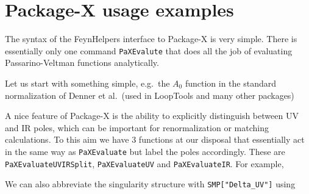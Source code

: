 \documentclass[../FeynHelpersManual.tex]{subfiles}
\begin{document}
\hypertarget{package-x usage examples}{
\section{Package-X usage examples}\label{package-x usage examples}}

The syntax of the FeynHelpers interface to Package-X is very simple.
There is essentially only one command \texttt{PaXEvalute} that does all
the job of evaluating Passarino-Veltman functions analytically.

Let us start with something simple, e.g.~the \(A_0\) function in the
standard normalization of Denner et al.~(used in LoopTools and many
other packages)

\begin{Shaded}
\begin{Highlighting}[]
\ExtensionTok{=}\OperatorTok{[}\OperatorTok{[}\SpecialCharTok{\^{}}\OperatorTok{]]}
\end{Highlighting}
\end{Shaded}

A nice feature of Package-X is the ability to explicitly distinguish
between UV and IR poles, which can be important for renormalization or
matching calculations. To this aim we have 3 functions at our disposal
that essentially act in the same way as \texttt{PaXEvaluate} but label
the poles accordingly. These are \texttt{PaXEvaluateUVIRSplit},
\texttt{PaXEvaluateUV} and \texttt{PaXEvaluateIR}. For example,

\begin{Shaded}
\begin{Highlighting}[]
\OperatorTok{[}\OperatorTok{[}\SpecialCharTok{\^{}}\OperatorTok{]]}
\end{Highlighting}
\end{Shaded}

We can also abbreviate the singularity structure with
\texttt{SMP[\allowbreak{}"Delta_UV"]} using

\begin{Shaded}
\begin{Highlighting}[]
\ExtensionTok{=}\OperatorTok{[}\OperatorTok{]}
\end{Highlighting}
\end{Shaded}
\end{document}
